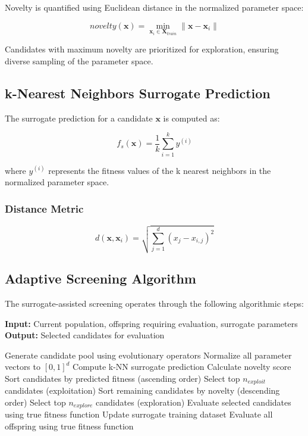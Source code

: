 \documentclass[12pt,a4paper]{article}
\begin{document}
Novelty is quantified using Euclidean distance in the normalized parameter space:

\begin{equation}
novelty(\mathbf{x}) = \min_{\mathbf{x}_i \in \mathbf{X}_{train}} \|\mathbf{x} - \mathbf{x}_i\|
\end{equation}

Candidates with maximum novelty are prioritized for exploration, ensuring diverse sampling of the parameter space.

\subsection{k-Nearest Neighbors Surrogate Prediction}

The surrogate prediction for a candidate $\mathbf{x}$ is computed as:

\begin{equation}
f_s(\mathbf{x}) = \frac{1}{k} \sum_{i=1}^{k} y^{(i)}
\end{equation}

where $y^{(i)}$ represents the fitness values of the k nearest neighbors in the normalized parameter space.

\subsubsection{Distance Metric}
\begin{equation}
d(\mathbf{x}, \mathbf{x}_i) = \sqrt{\sum_{j=1}^{d} (x_j - x_{i,j})^2}
\end{equation}

\subsection{Adaptive Screening Algorithm}

The surrogate-assisted screening operates through the following algorithmic steps:

\begin{algorithmic}[1]
\State \textbf{Input:} Current population, offspring requiring evaluation, surrogate parameters
\State \textbf{Output:} Selected candidates for evaluation

    \State Generate candidate pool using evolutionary operators
    \State Normalize all parameter vectors to $[0,1]^d$
        \State Compute k-NN surrogate prediction
        \State Calculate novelty score
    \EndFor
    \State Sort candidates by predicted fitness (ascending order)
    \State Select top $n_{exploit}$ candidates (exploitation)
    \State Sort remaining candidates by novelty (descending order)
    \State Select top $n_{explore}$ candidates (exploration)
    \State Evaluate selected candidates using true fitness function
    \State Update surrogate training dataset
\Else
    \State Evaluate all offspring using true fitness function
\EndIf
\end{algorithmic}
\end{document}
